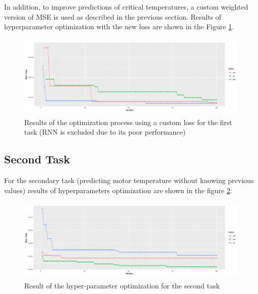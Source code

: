 In addition, to improve predictions of critical temperatures, a custom weighted version of MSE is used as described in the previous section. Results of hyperparameter optimization with the new loss are shown in the Figure \ref{fig:automl_custom}.\\
\begin{figure}[!h]
    \centering
    \includegraphics[width=\linewidth, height=4cm]{imgs/comparison_MSE_new_loss.png}
    \caption{Results of the optimization process using a custom loss for the first task (RNN is excluded due to its poor performance)}
    \label{fig:automl_custom}
\end{figure}



\subsection{Second Task}
For the secondary task (predicting motor temperature without knowing previous values) results of hyperparameters optimization are shown in the figure \ref{fig:second_task}:
\begin{figure}[!h]
    \centering
    \includegraphics[width=\linewidth, height=4cm]{imgs/comparison_MSE_second.png}
    \caption{Result of the hyper-parameter optimization for the second task}
    \label{fig:second_task}
\end{figure}
  

